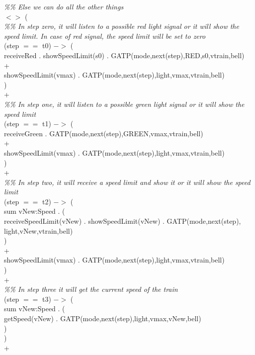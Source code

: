 \documentclass[11pt,a4paper]{article}
\begin{document}
		\textit{\%\% Else we can do all the other things} \\
			$<>$ ( \\
				\textit{\%\% In step zero, it will listen to a possible red light signal or it will show the speed limit. In case of red signal, the speed limit will be set to zero} \\
				(step $==$ t0) $->$ (\\
					receiveRed . showSpeedLimit(s0) . GATP(mode,next(step),RED,s0,vtrain,bell)\\
					+\\
					showSpeedLimit(vmax) . GATP(mode,next(step),light,vmax,vtrain,bell)\\
					)\\
				+\\
				\textit{\%\% In step one, it will listen to a possible green light signal or it will show the speed limit} \\
				(step $==$ t1) $->$ ( \\
					receiveGreen . GATP(mode,next(step),GREEN,vmax,vtrain,bell)\\
					+\\
					showSpeedLimit(vmax) . GATP(mode,next(step),light,vmax,vtrain,bell)\\
					)\\
				+\\
     \textit{\%\% In step two, it will receive a speed limit and show it or it will show the speed limit}\\ 
				(step $==$ t2) $->$ (\\
					sum vNew:Speed . (\\
						receiveSpeedLimit(vNew) . showSpeedLimit(vNew) . GATP(mode,next(step), light,vNew,vtrain,bell)\\
						)\\
					+\\
					showSpeedLimit(vmax) . GATP(mode,next(step),light,vmax,vtrain,bell)\\
					)\\
				+\\
				\textit{\%\% In step three it will get the current speed of the train}\\
				(step $==$ t3) $->$ (\\
					sum vNew:Speed . (\\
						getSpeed(vNew) . GATP(mode,next(step),light,vmax,vNew,bell)\\
						)\\
					)\\
				+\\
\end{document}
